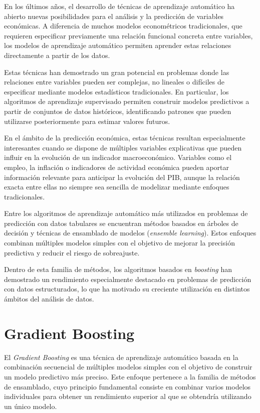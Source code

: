 En los últimos años, el desarrollo de técnicas de aprendizaje automático ha abierto nuevas posibilidades para el análisis y la predicción de variables económicas. A diferencia de muchos modelos econométricos tradicionales, que requieren especificar previamente una relación funcional concreta entre variables, los modelos de aprendizaje automático permiten aprender estas relaciones directamente a partir de los datos.

Estas técnicas han demostrado un gran potencial en problemas donde las relaciones entre variables pueden ser complejas, no lineales o difíciles de especificar mediante modelos estadísticos tradicionales. En particular, los algoritmos de aprendizaje supervisado permiten construir modelos predictivos a partir de conjuntos de datos históricos, identificando patrones que pueden utilizarse posteriormente para estimar valores futuros.

En el ámbito de la predicción económica, estas técnicas resultan especialmente interesantes cuando se dispone de múltiples variables explicativas que pueden influir en la evolución de un indicador macroeconómico. Variables como el empleo, la inflación o indicadores de actividad económica pueden aportar información relevante para anticipar la evolución del PIB, aunque la relación exacta entre ellas no siempre sea sencilla de modelizar mediante enfoques tradicionales.

Entre los algoritmos de aprendizaje automático más utilizados en problemas de predicción con datos tabulares se encuentran métodos basados en árboles de decisión y técnicas de ensamblado de modelos (\textit{ensemble learning}). Estos enfoques combinan múltiples modelos simples con el objetivo de mejorar la precisión predictiva y reducir el riesgo de sobreajuste.

Dentro de esta familia de métodos, los algoritmos basados en \textit{boosting} han demostrado un rendimiento especialmente destacado en problemas de predicción con datos estructurados, lo que ha motivado su creciente utilización en distintos ámbitos del análisis de datos.

\section{Gradient Boosting}

El \textit{Gradient Boosting} es una técnica de aprendizaje automático basada en la combinación secuencial de múltiples modelos simples con el objetivo de construir un modelo predictivo más preciso. Este enfoque pertenece a la familia de métodos de ensamblado, cuyo principio fundamental consiste en combinar varios modelos individuales para obtener un rendimiento superior al que se obtendría utilizando un único modelo. \citep{friedman_gradient_boosting_2001, zhou_ensemble_2012}

